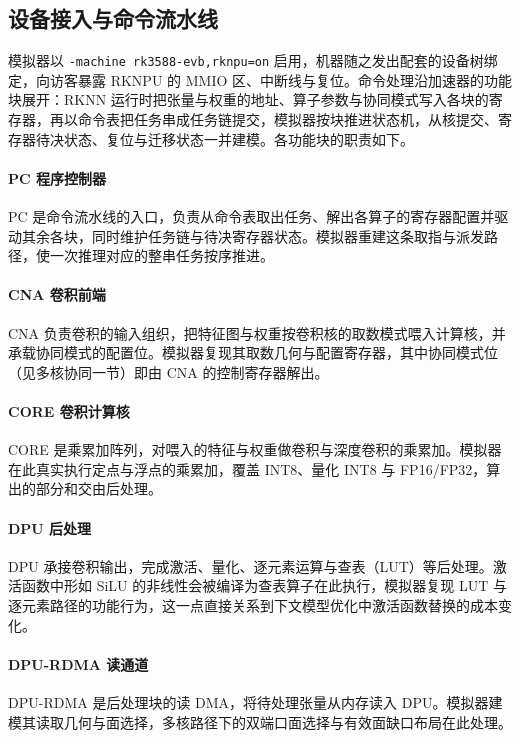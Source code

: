 \subsection{设备接入与命令流水线}

模拟器以 \texttt{-machine rk3588-evb,rknpu=on} 启用，机器随之发出配套的设备树绑定，向访客暴露 RKNPU 的 MMIO 区、中断线与复位。命令处理沿加速器的功能块展开：RKNN 运行时把张量与权重的地址、算子参数与协同模式写入各块的寄存器，再以命令表把任务串成任务链提交，模拟器按块推进状态机，从核提交、寄存器待决状态、复位与迁移状态一并建模。各功能块的职责如下。

\paragraph{PC 程序控制器}
PC 是命令流水线的入口，负责从命令表取出任务、解出各算子的寄存器配置并驱动其余各块，同时维护任务链与待决寄存器状态。模拟器重建这条取指与派发路径，使一次推理对应的整串任务按序推进。

\paragraph{CNA 卷积前端}
CNA 负责卷积的输入组织，把特征图与权重按卷积核的取数模式喂入计算核，并承载协同模式的配置位。模拟器复现其取数几何与配置寄存器，其中协同模式位（见多核协同一节）即由 CNA 的控制寄存器解出。

\paragraph{CORE 卷积计算核}
CORE 是乘累加阵列，对喂入的特征与权重做卷积与深度卷积的乘累加。模拟器在此真实执行定点与浮点的乘累加，覆盖 INT8、量化 INT8 与 FP16/FP32，算出的部分和交由后处理。

\paragraph{DPU 后处理}
DPU 承接卷积输出，完成激活、量化、逐元素运算与查表（LUT）等后处理。激活函数中形如 SiLU 的非线性会被编译为查表算子在此执行，模拟器复现 LUT 与逐元素路径的功能行为，这一点直接关系到下文模型优化中激活函数替换的成本变化。

\paragraph{DPU-RDMA 读通道}
DPU-RDMA 是后处理块的读 DMA，将待处理张量从内存读入 DPU。模拟器建模其读取几何与面选择，多核路径下的双端口面选择与有效面缺口布局在此处理。

